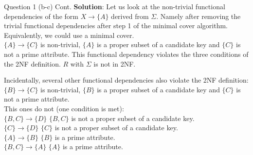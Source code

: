 \begin{frame}[fragile]{Question 1 (b-c) Cont.}
\textbf{Solution}:
Let us look at the non-trivial functional dependencies of the form $X \rightarrow \{A\}$ derived from $\Sigma$. Namely after removing the trivial functional dependencies after step 1 of the minimal cover algorithm. Equivalently, we could use a minimal cover.\\\vspace{3pt}
$\{A\} \rightarrow \{C\}$ is non-trivial, $\{A\}$ is a proper subset of a candidate key and $\{C\}$ is not a prime attribute. This functional dependency violates the three conditions of the 2NF definition. $R$ with $\Sigma$ is not in 2NF.\\\vspace{3pt}

Incidentally, several other functional dependencies also violate the 2NF definition:\\
$\{B\} \rightarrow \{C\}$ is non-trivial, $\{B\}$ is a proper subset of a candidate key and $\{C\}$ is not a prime attribute. \\\vspace{3pt}
This ones do not (one condition is met):\\
$\{B,C\} \rightarrow \{D\}$ $\{B,C\}$ is not a proper subset of a candidate key.\\
$\{C\} \rightarrow \{D\}$ $\{C\}$ is not a proper subset of a candidate key.\\
$\{A\} \rightarrow \{B\}$ $\{B\}$ is a prime attribute.\\
$\{B, C\} \rightarrow \{A\}$ $\{A\}$ is a prime attribute.
\end{frame}

